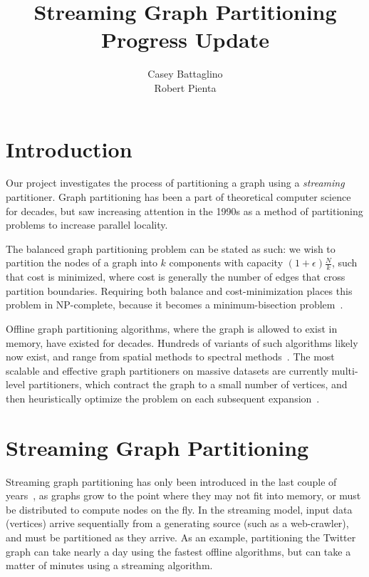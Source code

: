 \documentclass[11pt]{article}
\title{Streaming Graph Partitioning \\ Progress Update}
\author{Casey Battaglino\\Robert Pienta}
\date{}
\begin{document}
\maketitle
\section*{Introduction} \vspace{-10 pt}
Our project investigates the process of partitioning a graph using a \emph{streaming} partitioner. Graph partitioning has been a part of theoretical computer science for decades, but saw increasing attention in the 1990s as a method of partitioning problems to increase parallel locality. 

The balanced graph partitioning problem can be stated as such: we wish to partition the nodes of a graph into $k$ components with capacity $(1+\epsilon)\frac{N}{k}$, such that cost is minimized, where cost is generally the number of edges that cross partition boundaries. Requiring both balance and cost-minimization places this problem in NP-complete, because it becomes a minimum-bisection problem~\cite{Garey:1979:CIG:578533}.

Offline graph partitioning algorithms, where the graph is allowed to exist in memory, have existed for decades. Hundreds of variants of such algorithms likely now exist, and range from spatial methods to spectral methods~\cite{arora2009expander}. The most scalable and effective graph partitioners on massive datasets are currently multi-level partitioners, which contract the graph to a small number of vertices, and then heuristically optimize the problem on each subsequent expansion~\cite{karypis1998multilevel}. 

\section{Streaming Graph Partitioning}\vspace{-10 pt}
Streaming graph partitioning has only been introduced in the last couple of years~\cite{DBLP:journals/corr/abs-1212-1121,Stanton:2012:SGP:2339530.2339722,tsourakakis2012fennel}, as graphs grow to the point where they may not fit into memory, or must be distributed to compute nodes on the fly. In the streaming model, input data (vertices) arrive sequentially from a generating source (such as a web-crawler), and must be partitioned as they arrive. As an example, partitioning the Twitter graph can take nearly a day using the fastest offline algorithms, but can take a matter of minutes using a streaming algorithm.
\end{document}
